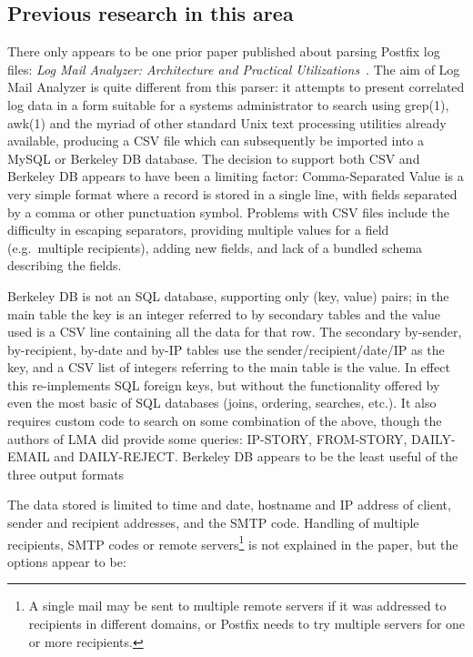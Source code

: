 \documentclass[a4paper,12pt,draft]{article}
\begin{document}
\subsection{Previous research in this area}

\label{prior art}

There only appears to be one prior paper published about parsing Postfix
log files: \textit{Log Mail Analyzer: Architecture and Practical
Utilizations\/}~\cite{log-mail-analyser}.  The aim of Log Mail Analyzer is
quite different from this parser: it attempts to present correlated log
data in a form suitable for a systems administrator to search using
grep(1), awk(1) and the myriad of other standard Unix text processing
utilities already available, producing a CSV file which can subsequently be
imported into a MySQL or Berkeley DB database.  The decision to support
both CSV and Berkeley DB appears to have been a limiting factor:
Comma-Separated Value is a very simple format where a record is stored in a
single line, with fields separated by a comma or other punctuation symbol.
Problems with CSV files include the difficulty in escaping separators,
providing multiple values for a field (e.g.\ multiple recipients), adding
new fields, and lack of a bundled schema describing the fields.

Berkeley DB is not an SQL database, supporting only (key, value) pairs; in
the main table the key is an integer referred to by secondary tables and
the value used is a CSV line containing all the data for that row.  The
secondary by-sender, by-recipient, by-date and by-IP tables use the
sender/recipient/date/IP as the key, and a CSV list of integers referring
to the main table is the value.  In effect this re-implements SQL foreign
keys, but without the functionality offered by even the most basic of SQL
databases (joins, ordering, searches, etc.).  It also requires custom code
to search on some combination of the above, though the authors of LMA did
provide some queries: IP-STORY, FROM-STORY, DAILY-EMAIL and DAILY-REJECT\@.
Berkeley DB appears to be the least useful of the three output formats

The data stored is limited to time and date, hostname and IP address of
client, sender and recipient addresses, and the SMTP code.  Handling of
multiple recipients, SMTP codes or remote servers\footnote{A single mail
may be sent to multiple remote servers if it was addressed to recipients in
different domains, or Postfix needs to try multiple servers for one or more
recipients.} is not explained in the paper, but the options appear to be:
\end{document}

